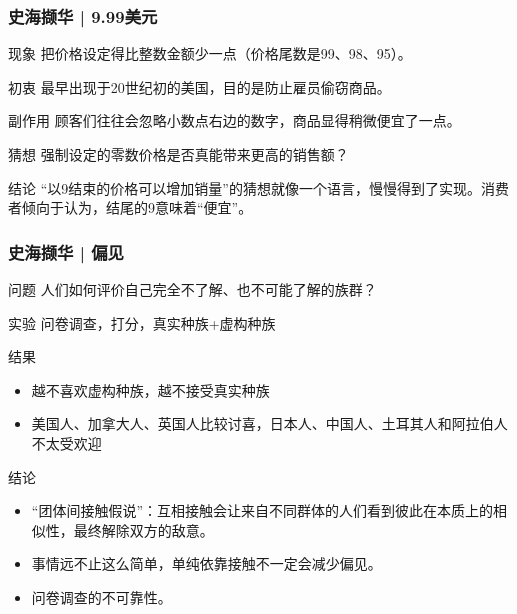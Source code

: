 \begin{frame}
  \frametitle{史海撷华 | 9.99美元}
  \begin{block}{现象}
    把价格设定得比整数金额少一点（价格尾数是99、98、95）。
  \end{block}
  \pause
  \begin{block}{初衷}
    最早出现于20世纪初的美国，目的是防止雇员偷窃商品。
  \end{block}
  \pause
  \begin{block}{副作用}
    顾客们往往会忽略小数点右边的数字，商品显得稍微便宜了一点。
  \end{block}
  \pause
  \begin{block}{猜想}
    强制设定的零数价格是否真能带来更高的销售额？
  \end{block}
  \pause
  \begin{block}{结论}
    “以9结束的价格可以增加销量”的猜想就像一个语言，慢慢得到了实现。消费者倾向于认为，结尾的9意味着“便宜”。
  \end{block}
\end{frame}

\begin{frame}
  \frametitle{史海撷华 | 偏见}
  \begin{block}{问题}
    人们如何评价自己完全不了解、也不可能了解的族群？
  \end{block}
  \vspace{-0.5em}
  \pause
  \begin{block}{实验}
    问卷调查，打分，真实种族+虚构种族
  \end{block}
  \vspace{-0.5em}
  \pause
  \begin{block}{结果}
    \begin{itemize}
      \item 越不喜欢虚构种族，越不接受真实种族
      \item 美国人、加拿大人、英国人比较讨喜，日本人、中国人、土耳其人和阿拉伯人不太受欢迎
    \end{itemize}
  \end{block}
  \vspace{-0.5em}
  \pause
  \begin{block}{结论}
    \begin{itemize}
      \item “团体间接触假说”：互相接触会让来自不同群体的人们看到彼此在本质上的相似性，最终解除双方的敌意。
      \item 事情远不止这么简单，单纯依靠接触不一定会减少偏见。
      \item 问卷调查的不可靠性。
    \end{itemize}
  \end{block}
\end{frame}


